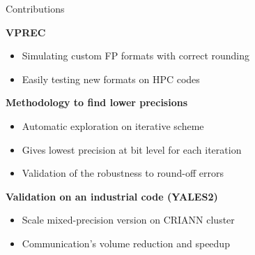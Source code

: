 \documentclass[10pt]{beamer}
\begin{document}
\begin{frame}{Contributions}
    \begin{block}{\textbf{\alert{VPREC}}}
        \begin{itemize}
            \item Simulating \alert{custom FP formats} with correct rounding
            \item Easily testing new formats on HPC codes
        \end{itemize}
    \end{block}

    \begin{block}{\textbf{\alert{Methodology to find lower precisions}}}
    \begin{itemize}
        \item \alert{Automatic exploration} on iterative scheme 
        \item Gives lowest precision at \alert{bit level} for \alert{each iteration}
        \item Validation of the \alert{robustness} to round-off errors
    \end{itemize}
    \end{block}
    \begin{block}{\textbf{\alert{Validation on an industrial code (YALES2)}}}
        \begin{itemize}
            \item Scale mixed-precision version on CRIANN cluster
            \item \alert{Communication's volume} reduction and \alert{speedup}
        \end{itemize}
    \end{block}
\end{frame}
\end{document}
